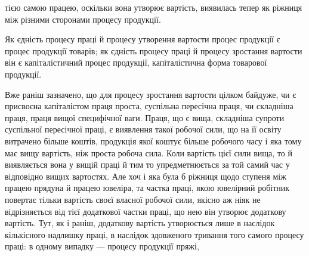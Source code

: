 \parcont{}  %
тією самою працею, оскільки вона утворює вартість, виявилась
тепер як ріжниця між різними сторонами процесу продукції.

Як єдність процесу праці й процесу утворення вартости процес
продукції є процес продукції товарів; як єдність процесу
праці й процесу зростання вартости він є капіталістичний процес
продукції, капіталістична форма товарової продукції.

Вже раніш зазначено, що для процесу зростання вартости
цілком байдуже, чи є присвоєна капіталістом праця проста, суспільна
пересічна праця, чи складніша праця, праця вищої специфічної
ваги. Праця, що є вища, складніша супроти суспільної пересічної
праці, є виявлення такої робочої сили, що на її освіту витрачено
більше коштів, продукція якої коштує більше робочого
часу і яка тому має вищу вартість, ніж проста робоча сила.
Коли вартість цієї сили вища, то й виявляється вона у вищій
праці й тим то упредметнюється за той самий час у відповідно
вищих вартостях. Але хоч і яка була б ріжниця щодо ступеня
між працею прядуна й працею ювеліра, та частка праці, якою
ювелірний робітник повертає тільки вартість своєї власної робочої
сили, якісно аж ніяк не відрізняється від тієї додаткової
частки праці, що нею він утворює додаткову вартість. Тут, як і
раніш, додаткову вартість утворюється лише в наслідок кількісного
надлишку праці, в наслідок здовженого тривання того самого
процесу праці: в одному випадку — процесу продукції пряжі,

